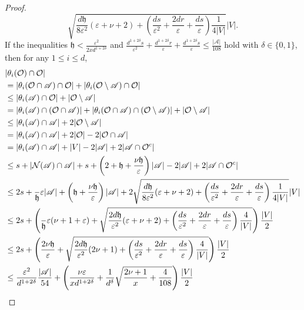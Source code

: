 \documentclass[ALCO,Unicode,published]{cedram}
\newcommand{\calN}{\ensuremath{\mathcal{N}}}
\newcommand{\calO}{\ensuremath{\mathcal{O}}}
\newcommand{\scrA}{\ensuremath{\mathscr{A}}}
\newcommand{\tth}{\ensuremath{\mathfrak{h}}}
\begin{document}
\begin{proof}
$$\sqrt{\frac{d\tth}{8\varepsilon^2} (\varepsilon + \nu + 2) 
+
\left(\frac{ds}{\varepsilon^2} + \frac{2dr}\varepsilon + \frac{ds}{\varepsilon}
\right)
\frac{1}{4|V|}
}|V|.$$
If the inequalities $\tth<  \frac{\varepsilon^{2}}{2x d^{1 + 2\delta}}$ and $ \frac{ d^{1 + 2\delta} s}{\varepsilon^2 }
+ \frac{ d^{1 + 2\delta} r}{\varepsilon } + \frac{d^{1 + 2\delta} s}{\varepsilon}\leq \frac{|\scrA|}{108}$ hold with $\delta \in \{0, 1\}$, then for any $1\leq i \leq d$, 
\begin{align*}
&|\theta_i(\calO)\cap \calO |\\
& = |\theta_i(\calO\cap \scrA) \cap \calO| + |\theta_i(\calO\setminus \scrA) \cap \calO|\\
& \leq |\theta_i(\scrA) \cap \calO| + |\calO\setminus \scrA|\\
& = |\theta_i(\scrA) \cap (\calO\cap \scrA) | + |\theta_i(\calO\cap \scrA) \cap (\calO\setminus \scrA) | + |\calO\setminus \scrA|\\ 
& \leq |\theta_i(\scrA) \cap \scrA| + 2|\calO\setminus \scrA|\\ 
& = |\theta_i(\scrA) \cap \scrA| + 2|\calO| - 2|\calO\cap \scrA|\\ 
& = |\theta_i(\scrA) \cap \scrA| + |V| - 2|\scrA| + 2|\scrA\cap \calO^c|\\ 
& \leq s +  |\calN(\scrA) \cap \scrA| + s + \left(2 + \tth + \frac{\nu\tth}{\varepsilon}\right)|\scrA|- 2|\scrA| + 2|\scrA\cap \calO^c|\\ 
& \leq 2s + \frac \tth\varepsilon |\scrA| + \left( \tth + \frac{\nu\tth}{\varepsilon}\right)|\scrA| + 2\sqrt{\frac{d\tth}{8\varepsilon^2} (\varepsilon + \nu + 2) 
	+
	\left(\frac{ds}{\varepsilon^2} + \frac{2dr}\varepsilon + \frac{ds}{\varepsilon}
	\right)
	\frac{1}{4|V|}
}|V| \\
& \leq 2s + \left(\frac \tth\varepsilon (\nu+1 + \varepsilon)  + \sqrt{\frac{2d\tth}{\varepsilon^2} (\varepsilon + \nu + 2) 
+\left(\frac{ds}{\varepsilon^2} + \frac{2dr}\varepsilon + \frac{ds}{\varepsilon}
\right)
\frac{4}{|V|}
}\right) \frac{|V|}{2} \\
& \leq 2s + \left(\frac {2\nu\tth}\varepsilon + \sqrt{\frac{2d\tth}{\varepsilon^2} (2\nu + 1) 
+\left(\frac{ds}{\varepsilon^2} + \frac{2dr}\varepsilon + \frac{ds}{\varepsilon}
\right)
\frac{4}{|V|}
}\right) \frac{|V|}{2} \\
& \leq \frac{\varepsilon^2}{d^{1 + 2\delta}} \frac{|\scrA|}{54} + \left(\frac {\nu\varepsilon}{xd^{1 + 2\delta}} + \frac 1 {d^{\delta}}\sqrt{\frac{ 2\nu + 1 }{x}
+
\frac{4}{108}
}\right) \frac{|V|}{2} \\

\end{align*}
\end{proof}
\end{document}
